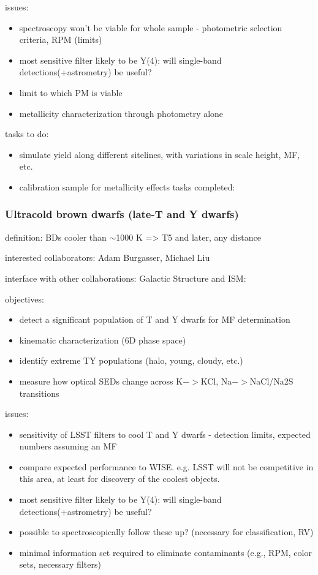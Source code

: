 issues: 
\begin{itemize}
\item{spectroscopy 
won’t be viable for whole sample - photometric selection criteria, RPM 
(limits) }
\item{most 
sensitive filter likely to be Y(4): will single-band detections(+astrometry) be useful? }
\item{limit 
to which PM is viable }
\item{metallicity 
characterization through photometry alone }
\end{itemize}

tasks to do: 
\begin{itemize}
\item{simulate 
yield along different sitelines, with variations in scale height, MF, etc. }
\item{calibration 
sample for metallicity effects  tasks completed: }
\end{itemize}


\subsubsection{Ultracold brown dwarfs (late-T and Y dwarfs)} 
definition: BDs cooler than $\sim$1000 K => T5 and later, any distance  

interested collaborators: 
Adam Burgasser, Michael Liu 

interface with other collaborations: 
Galactic 
Structure and ISM: 

objectives: 
\begin{itemize}
\item{detect 
a significant population of T and Y dwarfs for MF determination }
\item{kinematic 
characterization (6D phase space) }
\item{identify 
extreme TY populations (halo, young, cloudy, etc.) }
\item{measure 
how optical SEDs change across K$->$KCl, Na$->$NaCl/Na2S transitions }
\end{itemize}

issues: 
\begin{itemize}
\item{sensitivity 
of LSST filters to cool T and Y dwarfs - detection limits, expected numbers 
assuming an MF }
\item{compare 
expected performance to WISE. 
e.g. LSST will not be competitive in this area, 
at least for discovery of the coolest objects. }
\item{most 
sensitive filter likely to be Y(4): will single-band detections(+astrometry) be useful? }
\item{possible 
to spectroscopically follow these up? (necessary for classification, RV) }
\item{minimal 
information set required to eliminate contaminants (e.g., RPM, color sets, 
necessary filters) }
\end{itemize}

